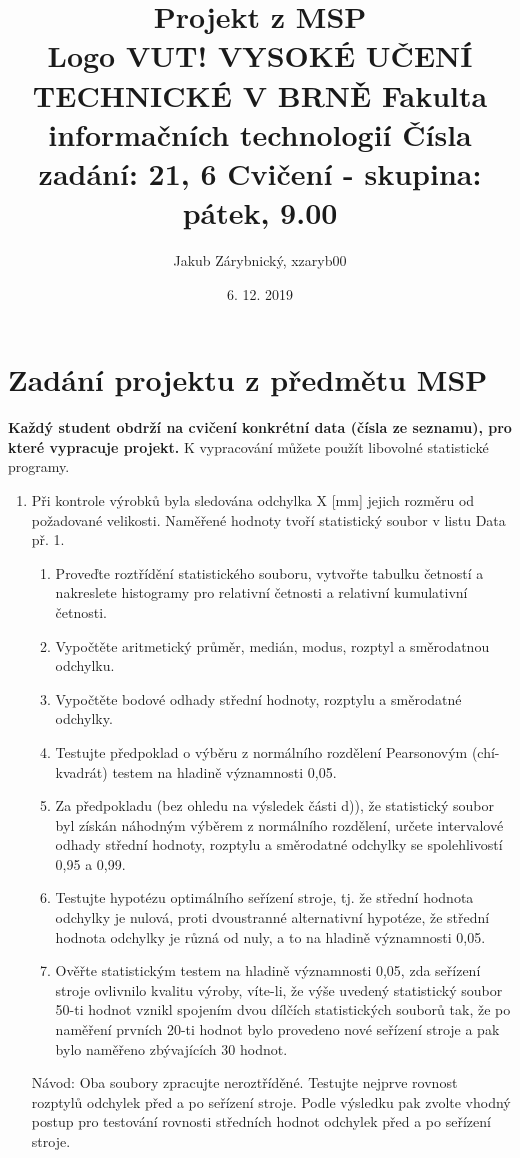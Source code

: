 \documentclass[11pt,titlepage]{article}
\author{Jakub Zárybnický, xzaryb00}
\date{6. 12. 2019}
\title{Projekt z MSP\\\medskip
\large Logo VUT! VYSOKÉ UČENÍ TECHNICKÉ V BRNĚ Fakulta informačních technologií Čísla zadání: 21, 6 Cvičení - skupina: pátek, 9.00}
\begin{document}


\section{Zadání projektu z předmětu MSP}
\label{sec:orgd7a26e9}
\textbf{Každý student obdrží na cvičení konkrétní data (čísla ze seznamu), pro které vypracuje projekt.}
K vypracování můžete použít libovolné statistické programy.

\begin{enumerate}
\item Při kontrole výrobků byla sledována odchylka X [mm] jejich rozměru od
požadované velikosti. Naměřené hodnoty tvoří statistický soubor v listu
Data př. 1.

\begin{enumerate}
\item Proveďte roztřídění statistického souboru, vytvořte tabulku četností a
nakreslete histogramy pro relativní četnosti a relativní kumulativní
četnosti.
\item Vypočtěte aritmetický průměr, medián, modus, rozptyl a směrodatnou
odchylku.
\item Vypočtěte bodové odhady střední hodnoty, rozptylu a směrodatné odchylky.
\item Testujte předpoklad o výběru z normálního rozdělení Pearsonovým
(chí-kvadrát) testem na hladině významnosti 0,05.
\item Za předpokladu (bez ohledu na výsledek části d)), že statistický soubor
byl získán náhodným výběrem z normálního rozdělení, určete intervalové
odhady střední hodnoty, rozptylu a směrodatné odchylky se spolehlivostí
0,95 a 0,99.
\item Testujte hypotézu optimálního seřízení stroje, tj. že střední hodnota
odchylky je nulová, proti dvoustranné alternativní hypotéze, že střední
hodnota odchylky je různá od nuly, a to na hladině významnosti 0,05.
\item Ověřte statistickým testem na hladině významnosti 0,05, zda seřízení
stroje ovlivnilo kvalitu výroby, víte-li, že výše uvedený statistický
soubor 50-ti hodnot vznikl spojením dvou dílčích statistických souborů
tak, že po naměření prvních 20-ti hodnot bylo provedeno nové seřízení
stroje a pak bylo naměřeno zbývajících 30 hodnot.
\end{enumerate}

Návod: Oba soubory zpracujte neroztříděné. Testujte nejprve rovnost rozptylů
odchylek před a po seřízení stroje. Podle výsledku pak zvolte vhodný postup
pro testování rovnosti středních hodnot odchylek před a po seřízení stroje.


\end{enumerate}
\end{document}
